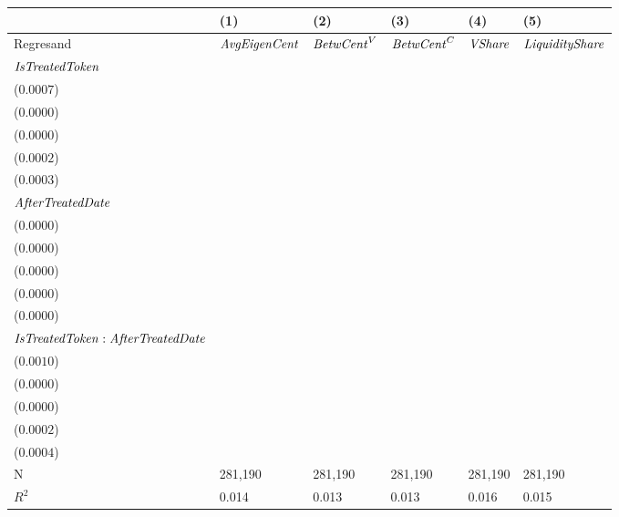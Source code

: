 \begin{tabular}{llllll}
\toprule
{} &                                      (1) &                                       (2) &                                       (3) &                                      (4) &                                       (5) \\
\midrule
Regresand                                     &                     ${\it AvgEigenCent}$ &                        ${\it BetwCent}^V$ &                        ${\it BetwCent}^C$ &                           ${\it VShare}$ &                    ${\it LiquidityShare}$ \\
${\it IsTreatedToken}$                        &  \makecell{$0.0138^{***}$ \\ ($0.0007$)} &   \makecell{$0.0003^{***}$ \\ ($0.0000$)} &   \makecell{$0.0001^{***}$ \\ ($0.0000$)} &  \makecell{$0.0037^{***}$ \\ ($0.0002$)} &   \makecell{$0.0093^{***}$ \\ ($0.0003$)} \\
${\it AfterTreatedDate}$                      &  \makecell{$0.0022^{***}$ \\ ($0.0000$)} &   \makecell{$0.0000^{***}$ \\ ($0.0000$)} &   \makecell{$0.0000^{***}$ \\ ($0.0000$)} &  \makecell{$0.0006^{***}$ \\ ($0.0000$)} &   \makecell{$0.0008^{***}$ \\ ($0.0000$)} \\
${\it IsTreatedToken}:{\it AfterTreatedDate}$ &  \makecell{$0.0044^{***}$ \\ ($0.0010$)} &  \makecell{$-0.0000^{***}$ \\ ($0.0000$)} &  \makecell{$-0.0000^{***}$ \\ ($0.0000$)} &  \makecell{$0.0012^{***}$ \\ ($0.0002$)} &  \makecell{$-0.0024^{***}$ \\ ($0.0004$)} \\
\midrule N                                    &                                  281,190 &                                   281,190 &                                   281,190 &                                  281,190 &                                   281,190 \\
$R^2$                                         &                                    0.014 &                                     0.013 &                                     0.013 &                                    0.016 &                                     0.015 \\
\bottomrule
\end{tabular}
